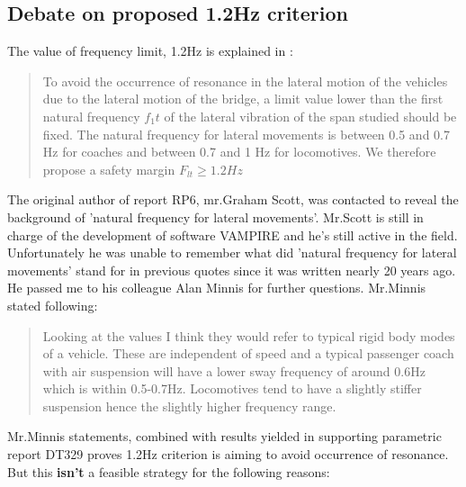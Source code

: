\subsection{Debate on proposed 1.2Hz criterion}\label{sec:1.2criterion329}

The value of frequency limit, 1.2Hz is explained in \citet[p3.2: Criterion 2]{d181}:

\begin{quote}
To avoid the occurrence of resonance in the lateral motion of the vehicles due to the lateral motion of the bridge, a limit value lower than the first natural frequency $f_1t$ of the lateral vibration of the span studied should be fixed. The natural frequency for lateral movements is between 0.5 and 0.7 Hz for coaches and between 0.7 and 1 Hz for locomotives. We therefore propose a safety margin $F_{lt} \geq 1.2Hz$

\end{quote}

The original author of report RP6, mr.Graham Scott, was contacted to reveal the background of 'natural frequency for lateral movements'. Mr.Scott is still in charge of the development of software VAMPIRE and he's still active in the field. Unfortunately he was unable to remember what did 'natural frequency for lateral movements' stand for in previous quotes since it was written nearly 20 years ago. He passed me to his colleague Alan Minnis for further questions. Mr.Minnis stated following:

\begin{quote}
Looking at the values I think they would refer to typical rigid body modes of a vehicle.  These are independent of speed and a typical passenger coach with air suspension will have a lower sway frequency of around 0.6Hz which is within 0.5-0.7Hz.  Locomotives tend to have a slightly stiffer suspension hence the slightly higher frequency range.
\end{quote}

Mr.Minnis statements, combined with results yielded in supporting parametric report DT329 proves 1.2Hz criterion is aiming to avoid occurrence of resonance. But this \textbf{isn't} a feasible strategy for the following reasons:

